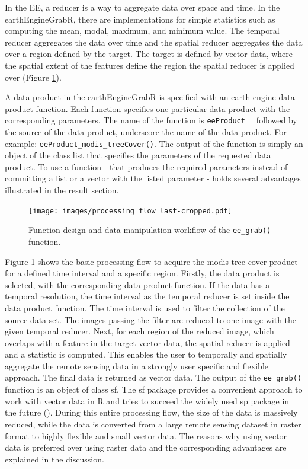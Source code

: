 In the EE, a reducer is a way to aggregate data over space and time. In the earthEngineGrabR, there are implementations for simple statistics such as computing the mean, modal, maximum, and minimum value. The temporal reducer aggregates the data over time and the spatial reducer aggregates the data over a region defined by the target. 
The target is defined by vector data, where the spatial extent of the features define the region the spatial reducer is applied over (Figure \ref*{Workflow}).

A data product in the earthEngineGrabR is specified with an earth engine data product-function. Each function specifies one particular data product with the corresponding parameters. The name of the function is \texttt{eeProduct\_ } followed by the source of the data product, underscore the name of the data product. For example: \texttt{eeProduct\_modis\_treeCover()}. The output of the function is simply an object of the class list that specifies the parameters of the requested data product. To use a function - that produces the required parameters instead of committing a list or a vector with the listed parameter - holds several advantages illustrated in the result section.




\begin{center}
	\begin{figure}[h]
		\begin{center}
			\texttt{[image: images/processing\_flow\_last-cropped.pdf]}
			\caption{Function design and data manipulation workflow of the \texttt{ee\_grab()} function.}
			\label{Workflow}
		\end{center}
	\end{figure}
\end{center}

Figure \ref{Workflow} shows the basic processing flow to acquire the modis-tree-cover product for a defined time interval and a specific region. Firstly, the data product is selected, with the corresponding data product function. If the data has a temporal resolution, the time interval as the temporal reducer is set inside the data product function. The time interval is used to filter the collection of the source data set. The images passing the filter are reduced to one image with the given temporal reducer. Next, for each region of the reduced image, which overlaps with a feature in the target vector data, the spatial reducer is applied and a statistic is computed. This enables the user to temporally and spatially aggregate the remote sensing data in a strongly user specific and flexible approach. The final data is returned as vector data.
The output of the \texttt{ee\_grab()} function is an object of class sf. The sf package provides a convenient approach to work with vector data in R and tries to succeed the widely used sp package in the future (\cite{sf}). 
During this entire processing flow, the size of the data is massively reduced, while the data is converted from a large remote sensing dataset in raster format to highly flexible and small vector data. The reasons why using vector data is preferred over using raster data and the corresponding advantages are explained in the discussion.

